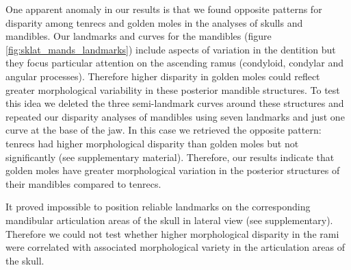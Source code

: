 \documentclass[12pt,a4paper]{article}
\begin{document}
	One apparent anomaly in our results is that we found opposite patterns for disparity among tenrecs and golden moles in the analyses of skulls and mandibles. 
	Our landmarks and curves for the mandibles (figure \ref{fig:sklat_mands_landmarks}) include aspects of variation in the dentition but they focus particular attention on the ascending ramus (condyloid, condylar and angular processes). Therefore higher disparity in golden moles could reflect greater morphological variability in these posterior mandible structures. To test this idea we deleted the three semi-landmark curves around these structures and repeated our disparity analyses of mandibles using seven landmarks and just one curve at the base of the jaw. In this case we retrieved the opposite pattern: tenrecs had higher morphological disparity than golden moles but not significantly (see supplementary material). Therefore, our results indicate that golden moles have greater morphological variation in the posterior structures of their mandibles compared to tenrecs.
	
		
 	It proved impossible to position reliable landmarks on the corresponding mandibular articulation areas of the skull in lateral view (see supplementary). Therefore we could not test whether higher morphological disparity in the rami were correlated with associated morphological variety in the articulation areas of the skull.
	



\end{document}
